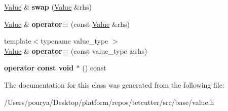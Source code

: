 \begin{DoxyCompactItemize}
\item 
\hypertarget{classps_1_1Value_a4fc174cf24bc7872eb2692652bc90e48}{}\hyperlink{classps_1_1Value}{Value} \& {\bfseries swap} (\hyperlink{classps_1_1Value}{Value} \&rhs)\label{classps_1_1Value_a4fc174cf24bc7872eb2692652bc90e48}

\item 
\hypertarget{classps_1_1Value_a4d97c97b44a48644cc9e6de01b033b0d}{}\hyperlink{classps_1_1Value}{Value} \& {\bfseries operator=} (const \hyperlink{classps_1_1Value}{Value} \&rhs)\label{classps_1_1Value_a4d97c97b44a48644cc9e6de01b033b0d}

\item 
\hypertarget{classps_1_1Value_a3acf820a982de257bd77cb6f75f9f030}{}{\footnotesize template$<$typename value\+\_\+type $>$ }\\\hyperlink{classps_1_1Value}{Value} \& {\bfseries operator=} (const value\+\_\+type \&rhs)\label{classps_1_1Value_a3acf820a982de257bd77cb6f75f9f030}

\item 
\hypertarget{classps_1_1Value_a5211288c17607a29258ca905a3769539}{}{\bfseries operator const void $\ast$} () const \label{classps_1_1Value_a5211288c17607a29258ca905a3769539}

\end{DoxyCompactItemize}


The documentation for this class was generated from the following file\+:\begin{DoxyCompactItemize}
\item 
/\+Users/pourya/\+Desktop/platform/repos/tetcutter/src/base/value.\+h\end{DoxyCompactItemize}

